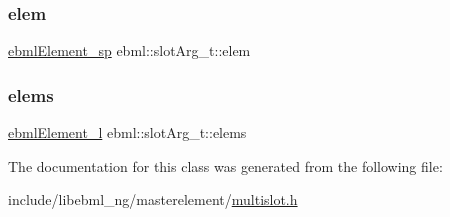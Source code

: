 \subsubsection{\texorpdfstring{elem}{elem}}
{\footnotesize\ttfamily \mbox{\hyperlink{namespaceebml_adad533b7705a16bb360fe56380c5e7be}{ebml\+Element\+\_\+sp}} ebml\+::slot\+Arg\+\_\+t\+::elem}

\mbox{\label{classebml_1_1slotArg__t_aa7536b9a47e616fb677d57e2bba570ba}} 
\subsubsection{\texorpdfstring{elems}{elems}}
{\footnotesize\ttfamily \mbox{\hyperlink{namespaceebml_a1ddadd26791f273d851882653b9caf70}{ebml\+Element\+\_\+l}} ebml\+::slot\+Arg\+\_\+t\+::elems}



The documentation for this class was generated from the following file\+:\begin{DoxyCompactItemize}
\item 
include/libebml\+\_\+ng/masterelement/\mbox{\hyperlink{multislot_8h}{multislot.\+h}}\end{DoxyCompactItemize}
